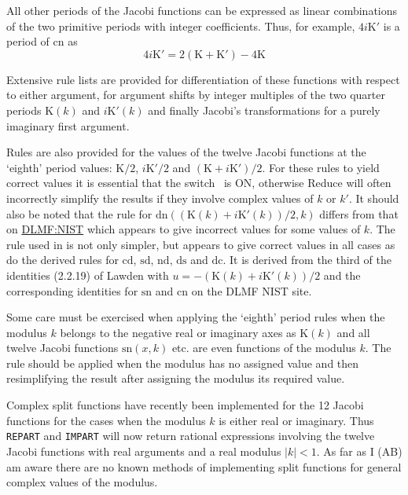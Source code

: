 All other periods of the Jacobi functions can be expressed as linear
combinations of the two primitive periods with integer coefficients.
Thus, for example, $4i\mathrm{K}'$ is a period of $\mathrm{cn}$ as
\[4i\mathrm{K}' = 2(\mathrm{K}+\mathrm{K}') -4\mathrm{K}\]

Extensive rule lists are provided for differentiation of these functions with
respect to either argument, for argument shifts by integer multiples of the
two quarter periods $\mathrm{K}(k)$ and $i\mathrm{K}'(k)$ and finally
Jacobi's transformations for a purely imaginary first argument.

Rules are also provided for the values of the twelve Jacobi functions at the
`eighth' period values: $\mathrm{K}/2$, $i\mathrm{K}'/2$ and
$(\mathrm{K}+i\mathrm{K}')/2$. For these rules to yield correct values it
is essential that the switch \ is ON, otherwise Reduce will
often incorrectly simplify the results if they involve complex values of $k$ or
$k'$. It should also be noted that the rule for
$\mathrm{dn}((\mathrm{K}(k)+i\mathrm{K}'(k))/2, k)$ differs from that on
\href{https://dlmf.nist.gov/22.5#i}{DLMF:NIST} which appears to give incorrect
values for some values of $k$. The rule used in \REDUCE is not only simpler,
but appears to give correct values in all cases as do the derived rules for
$\mathrm{cd}$, $\mathrm{sd}$, $\mathrm{nd}$, $\mathrm{ds}$ and $\mathrm{dc}$.
It is derived from the third of the identities (2.2.19) of Lawden
\cite{Lawden:89} with $u =-(\mathrm{K}(k)+i\mathrm{K}'(k))/2$ and
the corresponding identities for $\mathrm{sn}$ and $\mathrm{cn}$ on the
DLMF NIST site.

Some care must be exercised when applying the `eighth' period rules when
the modulus $k$ belongs to the negative real or imaginary axes as
$\mathrm{K}(k)$ and all twelve Jacobi functions $\mathrm{sn}(x,k)$ etc. are
even functions of the modulus $k$. The rule should be applied when the modulus
has no assigned value and then resimplifying the result after assigning the
modulus its required value.

Complex split functions have recently been implemented for the 12 Jacobi
functions for the cases when the modulus $k$ is either real or imaginary.
Thus \texttt{REPART} and \texttt{IMPART} will now return rational expressions
involving the twelve Jacobi functions with real arguments and a real modulus
$|k|<1$. As far as I (AB) am aware there are no known methods of implementing
split functions for general complex values of the modulus.

